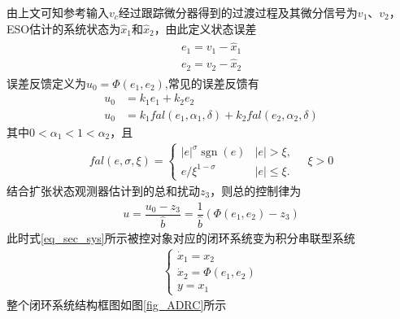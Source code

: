 由上文可知参考输入$ v_c $经过跟踪微分器得到的过渡过程及其微分信号为$ v_1 $、$ v_2 $，ESO估计的系统状态为$ \hat{x}_1 $和$ \hat{x}_2 $，由此定义状态误差
\begin{align}\begin{array}{l}
e_{1}=v_{1}-\hat{x}_{1} \\
e_{2}=v_{2}-\hat{x}_{2}
\end{array}\end{align}
误差反馈定义为$ u_{0}=\Phi (e_1,e_2) $,常见的误差反馈有
\begin{align}
u_{0} &=k_1 e_{1}+k_2 e_{2} \label{eq_LEF}	\\	
u_{0} &=k_{1} fal\left(e_{1}, \alpha_{1}, \delta\right)+k_{2} fal\left(e_{2}, \alpha_{2}, \delta\right)	\label{eq_NLEF}
\end{align}
其中$ 0<\alpha_{1}<1<\alpha_{2} $，且
\begin{align}
fal(e, \sigma, \xi)=
\begin{cases}
|e|^{\sigma} \operatorname{sgn}(e) &  |e|>\xi,\\
e / \xi^{1-\sigma} &  |e| \leq \xi.
\end{cases}\quad \xi >0
\end{align}
结合扩张状态观测器估计到的总和扰动$ z_{3} $，则总的控制律为
\begin{align}
u=\dfrac{u_{0}-z_{3}}{\hat{b}}=\dfrac{1}{\hat{b}}(\Phi (e_1,e_2) -z_{3})
\end{align}
此时式\eqref{eq_sec_sys}所示被控对象对应的闭环系统变为积分串联型系统
\begin{align}\left\{\begin{array}{l}
\dot{x}_{1}=x_{2} \\
\dot{x}_{2}=\Phi(e_1,e_2) \\
y=x_{1}
\end{array}\right.\end{align}
整个闭环系统结构框图如图\ref{fig_ADRC}所示
